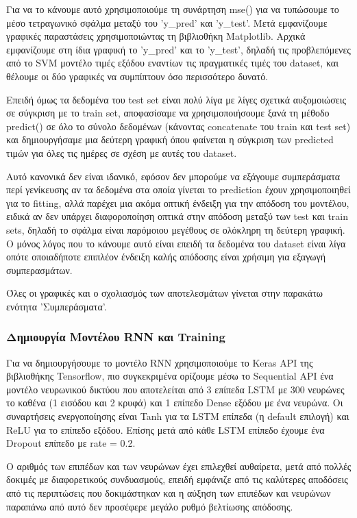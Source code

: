 \documentclass[12pt,a4paper]{article}
\begin{document}
Για να το κάνουμε αυτό χρησιμοποιούμε τη συνάρτηση mse() για να τυπώσουμε το μέσο τετραγωνικό σφάλμα μεταξύ του 'y\_pred' και 'y\_test'. Μετά εμφανίζουμε γραφικές παραστάσεις χρησιμοποιώντας τη βιβλιοθήκη Matplotlib. Αρχικά εμφανίζουμε στη ίδια γραφική το 'y\_pred' και το 'y\_test', δηλαδή τις προβλεπόμενες από το SVM μοντέλο τιμές εξόδου εναντίων τις πραγματικές τιμές του dataset, και θέλουμε οι δύο γραφικές να συμπίπτουν όσο περισσότερο δυνατό.

Επειδή όμως τα δεδομένα του test set είναι πολύ λίγα με λίγες σχετικά αυξομοιώσεις σε σύγκριση με το train set, αποφασίσαμε να χρησιμοποιήσουμε ξανά τη μέθοδο predict() σε όλο το σύνολο δεδομένων (κάνοντας concatenate του train και test set) και δημιουργήσαμε μια δεύτερη γραφική όπου φαίνεται η σύγκριση των predicted τιμών για όλες τις ημέρες σε σχέση με αυτές του dataset.

Αυτό κανονικά δεν είναι ιδανικό, εφόσον δεν μπορούμε να εξάγουμε συμπεράσματα περί γενίκευσης αν τα δεδομένα στα οποία γίνεται το prediction έχουν χρησιμοποιηθεί για το fitting, αλλά παρέχει μια ακόμα οπτική ένδειξη για την απόδοση του μοντέλου, ειδικά αν δεν υπάρχει διαφοροποίηση οπτικά στην απόδοση μεταξύ των test και train sets, δηλαδή το σφάλμα είναι παρόμοιου μεγέθους σε ολόκληρη τη δεύτερη γραφική. Ο μόνος λόγος που το κάνουμε αυτό είναι επειδή τα δεδομένα του dataset είναι λίγα οπότε οποιαδήποτε επιπλέον ένδειξη καλής απόδοσης είναι χρήσιμη για εξαγωγή συμπερασμάτων.

Όλες οι γραφικές και ο σχολιασμός των αποτελεσμάτων γίνεται στην παρακάτω ενότητα 'Συμπεράσματα'.

\subsubsection{Δημιουργία Μοντέλου RNN και Training}

Για να δημιουργήσουμε το μοντέλο RNN χρησιμοποιούμε το Keras API της βιβλιοθήκης Tensorflow, πιο συγκεκριμένα ορίζουμε μέσω το Sequential API ένα μοντέλο νευρωνικού δικτύου που αποτελείται από 3 επίπεδα LSTM με 300 νευρώνες το καθένα (1 εισόδου και 2 κρυφά) και 1 επίπεδο Dense εξόδου με ένα νευρώνα. Οι συναρτήσεις ενεργοποίησης είναι Tanh για τα LSTM επίπεδα (η default επιλογή) και ReLU για το επίπεδο εξόδου. Επίσης μετά από κάθε LSTM επίπεδο έχουμε ένα Dropout επίπεδο με rate = 0.2.

Ο αριθμός των επιπέδων και των νευρώνων έχει επιλεχθεί αυθαίρετα, μετά από πολλές δοκιμές με διαφορετικούς συνδυασμούς, επειδή εμφάνιζε από τις καλύτερες αποδόσεις από τις περιπτώσεις που δοκιμάστηκαν και η αύξηση των επιπέδων και νευρώνων παραπάνω από αυτό δεν προσέφερε μεγάλο ρυθμό βελτίωσης απόδοσης.
\end{document}
